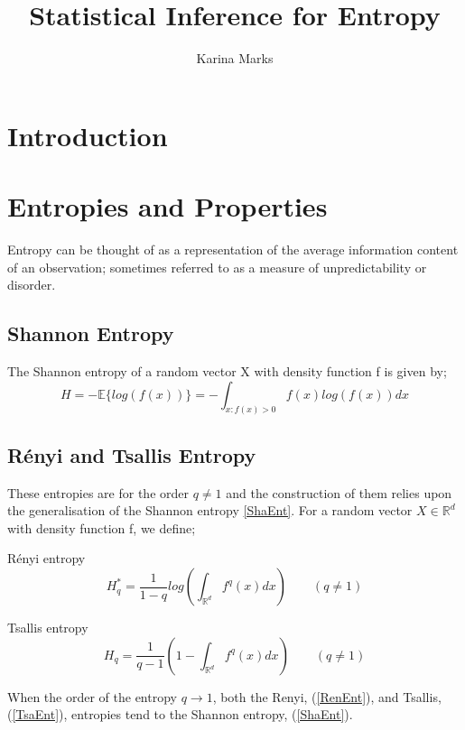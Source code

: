 \documentclass{article}
\title{Statistical Inference for Entropy}
\author{Karina Marks}
\begin{document}
\maketitle
\section{Introduction}



\section{Entropies and Properties}

Entropy can be thought of as a representation of the average information content of an observation; sometimes referred to as a measure of unpredictability or disorder. 

\subsection{Shannon Entropy}
The Shannon entropy of a random vector X with density function f is given by;
\begin{equation} \label{ShaEnt}
H = - \mathbb{E} \{log(f(x))\} = - \int_{x : f(x) > 0} f(x) log(f(x)) dx
\end{equation}

\subsection{ R\'enyi and Tsallis Entropy}
These entropies are for the order $q \neq 1$ and the construction of them relies upon the generalisation of the Shannon entropy \ref{ShaEnt}. For a random vector $X \in \mathbb{R}^d$ with density function f, we define;

R\'enyi entropy
\begin{equation} \label{RenEnt}
H_{q}^{*} = \frac{1}{1-q} log \left( \int_{\mathbb{R}^d} f^q (x) dx \right) \quad  \quad (q \neq 1)
\end{equation}

Tsallis entropy
\begin{equation} \label{TsaEnt}
H_{q} = \frac{1}{q-1} \left(1 - \int_{\mathbb{R}^d} f^q (x) dx \right)  \quad  \quad (q \neq 1)
\end{equation}

When the order of the entropy $q \to 1$, both the Renyi, (\ref{RenEnt}), and Tsallis, (\ref{TsaEnt}), entropies tend to the Shannon entropy, (\ref{ShaEnt}). 
\end{document}
